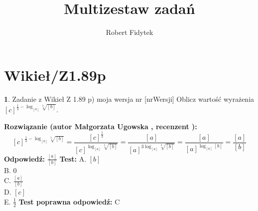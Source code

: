 \documentclass[12pt, a4paper]{article}
\title{Multizestaw zadań}
\author{Robert Fidytek}
\date{}
\theoremstyle{definition} %
\newtheorem{zad}{}
\newcommand{\kategoria}[1]{\section{#1}} %
\newcommand{\zadStart}[1]{\begin{zad}#1\newline} %
\newcommand{\zadStop}{\end{zad}}   %
\newcommand{\rozwStart}[2]{\noindent \textbf{Rozwiązanie (autor #1 , recenzent #2): }\newline} %
\newcommand{\rozwStop}{\newline}                                            %
\newcommand{\odpStart}{\noindent \textbf{Odpowiedź:}\newline}    %
\newcommand{\odpStop}{\newline}                                             %
\newcommand{\testStart}{\noindent \textbf{Test:}\newline} %
\newcommand{\testStop}{\newline} %
\newcommand{\kluczStart}{\noindent \textbf{Test poprawna odpowiedź:}\newline} %
\newcommand{\kluczStop}{\newline} %
\begin{document}
\maketitle


\kategoria{Wikieł/Z1.89p}
\zadStart{Zadanie z Wikieł Z 1.89 p) moja wersja nr [nrWersji]}
Oblicz warto\'sć wyrażenia $[c]^{\frac{1}{3} - \log_{[a]}{\sqrt[3]{[b]}}}$.
\zadStop
\rozwStart{Małgorzata Ugowska}{}
$$[c]^{\frac{1}{3} - \log_{[a]}{\sqrt[3]{[b]}}} = \frac{[c]^{\frac{1}{3}}}{[c]^{\log_{[a]}{\sqrt[3]{[b]}}}} = \frac{[a]}{[a]^{3 \log_{[a]}{\sqrt[3]{[b]}}}} = \frac{[a]}{[a]^{\log_{[a]}{[b]}}} = \frac{[a]}{[b]}$$
\rozwStop
\odpStart
$\frac{[a]}{[b]}$
\odpStop
\testStart
A. $[b]$\\
B. $0$\\
C. $\frac{[a]}{[b]}$\\
D. $[c]$\\
E. $\frac{1}{2}$
\testStop
\kluczStart
C
\kluczStop
\end{document}
